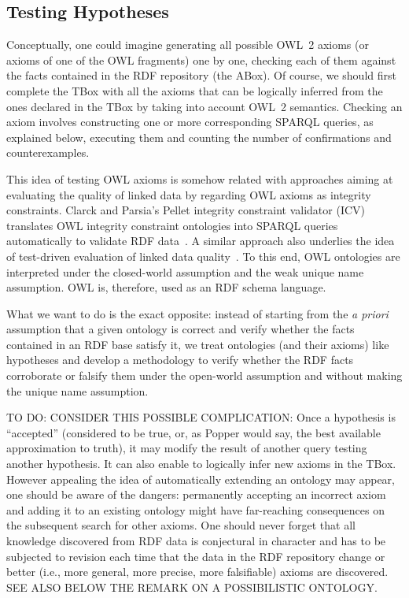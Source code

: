 \documentclass[a4paper]{article}
\newcounter{ex}
\begin{document}
\subsection{Testing Hypotheses}

Conceptually, one could imagine generating all possible OWL~2 axioms (or axioms of
one of the OWL fragments) one by one,
checking each of them against the facts contained in the RDF repository (the ABox).
Of course, we should first complete the TBox with all the axioms that can be
logically inferred from the ones declared in the TBox by taking into account OWL~2 semantics.
Checking an axiom involves constructing one or more corresponding SPARQL queries,
as explained below, executing them and counting the number of confirmations and counterexamples.

This idea of testing OWL axioms is somehow related with approaches aiming at evaluating
the quality of linked data by regarding OWL axioms as integrity constraints.
Clarck and Parsia's Pellet integrity constraint validator (ICV) translates OWL integrity constraint
ontologies into SPARQL queries automatically to validate RDF data~\cite{SirinTao2009}.
A similar approach also underlies the idea of test-driven evaluation of linked data
quality~\cite{KontokostasWestphalAuerHellmannLehmannCornelissen2014}.
To this end, OWL ontologies are interpreted under the closed-world assumption and
the weak unique name assumption. OWL is, therefore, used as an RDF schema language.

What we want to do is the exact opposite: instead of starting from the \emph{a priori}
assumption that a given ontology is correct and verify whether the facts contained
in an RDF base satisfy it, we treat ontologies (and their axioms) like hypotheses and develop
a methodology to verify whether the RDF facts corroborate or falsify them under the
open-world assumption and without making the unique name assumption.

TO DO: CONSIDER THIS POSSIBLE COMPLICATION:
Once a hypothesis is ``accepted'' (considered to be true, or, as Popper would say, the best
available approximation to truth),
it may modify the result of another query testing another hypothesis.
It can also enable to logically infer new axioms in the TBox.
However appealing the idea of automatically extending an ontology may appear,
one should be aware of the dangers: permanently accepting an incorrect axiom and adding
it to an existing ontology might have far-reaching consequences on the subsequent search
for other axioms. One should never forget that all knowledge discovered from RDF data
is conjectural in character and has to be subjected to revision each time that the data
in the RDF repository change or better (i.e., more general, more precise, more falsifiable)
axioms are discovered.
SEE ALSO BELOW THE REMARK ON A POSSIBILISTIC ONTOLOGY.
\end{document}

